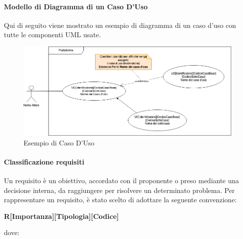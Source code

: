 \paragraph{Modello di Diagramma di un Caso D'Uso}

Qui di seguito viene mostrato un esempio di diagramma di un caso d'uso con tutte le componenti UML usate.
\begin{figure}[!h]
\centering
\includegraphics[scale=0.5]{Contenuto/Immagini/UseCase.png}
\caption{Esempio di Caso D'Uso}
\end{figure}

\paragraph{Classificazione requisiti}

Un requisito è un obiettivo, accordato con il proponente o preso mediante una decisione interna, da raggiungere per risolvere un determinato problema. Per rappresentare un requisito, è stato scelto di adottare la seguente convenzione:

\begin{center}
\textbf{R[Importanza][Tipologia][Codice]}
\end{center}

dove:


